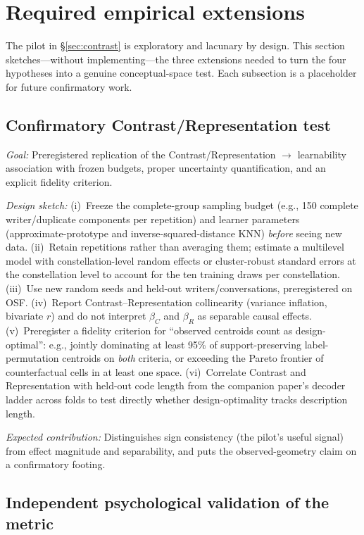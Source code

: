 \documentclass[11pt]{article}
\begin{document}
\section{Required empirical extensions}
\label{sec:extensions}

The pilot in \S\ref{sec:contrast} is exploratory and lacunary by design. This section sketches---without implementing---the three extensions needed to turn the four hypotheses into a genuine conceptual-space test. Each subsection is a placeholder for future confirmatory work.

\subsection{Confirmatory Contrast/Representation test}
\label{sec:ext-confirmatory}

\emph{Goal:} Preregistered replication of the Contrast/Representation $\to$ learnability association with frozen budgets, proper uncertainty quantification, and an explicit fidelity criterion.

\emph{Design sketch:} (i)~Freeze the complete-group sampling budget (e.g., 150 complete writer/duplicate components per repetition) and learner parameters (approximate-prototype and inverse-squared-distance KNN) \emph{before} seeing new data. (ii)~Retain repetitions rather than averaging them; estimate a multilevel model with constellation-level random effects or cluster-robust standard errors at the constellation level to account for the ten training draws per constellation. (iii)~Use new random seeds and held-out writers/conversations, preregistered on OSF. (iv)~Report Contrast--Representation collinearity (variance inflation, bivariate $r$) and do not interpret $\beta_C$ and $\beta_R$ as separable causal effects. (v)~Preregister a fidelity criterion for ``observed centroids count as design-optimal'': e.g., jointly dominating at least 95\% of support-preserving label-permutation centroids on \emph{both} criteria, or exceeding the Pareto frontier of counterfactual cells in at least one space. (vi)~Correlate Contrast and Representation with held-out code length from the companion paper's decoder ladder across folds to test directly whether design-optimality tracks description length.

\emph{Expected contribution:} Distinguishes sign consistency (the pilot's useful signal) from effect magnitude and separability, and puts the observed-geometry claim on a confirmatory footing.

\subsection{Independent psychological validation of the metric}
\label{sec:ext-metric}
\end{document}
